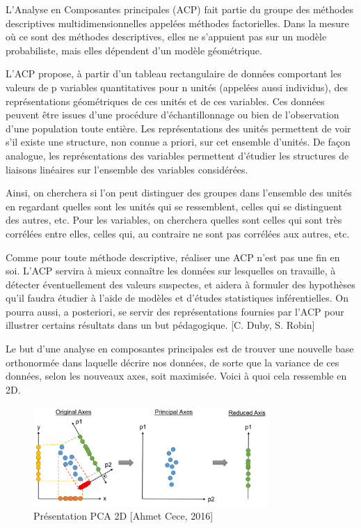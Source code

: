 \documentclass[12pt]{article}
\begin{document}
{L’Analyse en Composantes principales (ACP) fait partie du groupe des méthodes descriptives multidimensionnelles appelées méthodes factorielles.
Dans la mesure où ce sont des méthodes descriptives, elles ne s’appuient pas sur un modèle probabiliste, mais elles dépendent d’un modèle géométrique.

L’ACP propose, à partir d’un tableau rectangulaire de données comportant les valeurs de p variables quantitatives pour n unités (appelées aussi individus), des représentations géométriques de ces unités et de ces variables. 
Ces données peuvent être issues d’une procédure d’échantillonnage ou bien de l’observation d’une population toute entière. Les représentations des unités permettent de voir s’il existe une structure, non connue a priori, sur cet ensemble d’unités. De façon analogue, les représentations des variables permettent d’étudier les structures de liaisons linéaires sur l’ensemble des variables considérées. 

Ainsi, on cherchera si l’on peut distinguer des groupes dans l’ensemble des unités en regardant quelles sont les unités qui se ressemblent, celles qui se distinguent des autres, etc. Pour les variables, on cherchera quelles sont celles qui sont très corrélées entre elles, celles qui, au contraire ne sont pas corrélées aux autres, etc.

Comme pour toute méthode descriptive, réaliser une ACP n’est pas une fin en soi. L’ACP servira à mieux connaître les données sur lesquelles on travaille, à détecter éventuellement des valeurs suspectes, et aidera à formuler des hypothèses qu’il faudra étudier à l’aide de modèles et d’études statistiques inférentielles. 
On pourra aussi, a posteriori, se servir des représentations fournies par l’ACP pour illustrer certains résultats dans un but pédagogique. {\color{red}[C. Duby, S. Robin]}

Le but d'une analyse en composantes principales est de trouver une nouvelle base orthonormée dans laquelle décrire nos données, de sorte que la variance de ces données, selon les nouveaux axes, soit maximisée.
Voici à quoi cela ressemble en 2D.




\begin{figure}[H]
	\centering
    \includegraphics[width=0.8\textwidth]{image22.png}
     \caption{Présentation PCA 2D [Ahmet Cece, 2016] }
    \label{fig:22}
\end{figure}

}
\end{document}
